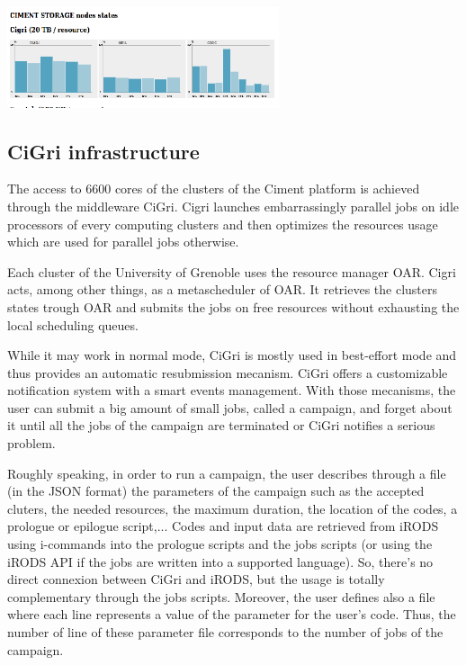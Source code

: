 \documentclass[a4paper, 10pt]{article}
\begin{document}
\begin{multicols}{2}
\begin{center}%
\centering
{}
\includegraphics[width=8cm]{schemaCimentStorageStatus.png}
\end{center}


\subsection{CiGri infrastructure}

The access to 6600 cores of the clusters of the Ciment platform is achieved through the middleware CiGri.
Cigri launches embarrassingly parallel jobs on idle processors of every computing clusters and then optimizes the resources usage which are used for parallel jobs otherwise.

Each cluster of the University of Grenoble uses the resource manager OAR. Cigri acts, among other things, as a metascheduler of OAR.
It retrieves the clusters states trough OAR and submits the jobs on free resources without exhausting the local scheduling queues.


While it may work in normal mode, CiGri is mostly used in best-effort mode and thus provides an automatic resubmission mecanism. CiGri offers a customizable notification system with a smart events management. With those mecanisms, the user can submit a big amount of small jobs, called a campaign, and forget about it until all the jobs of the campaign are terminated or CiGri notifies a serious problem.

Roughly speaking, in order to run a campaign, the user describes through a file (in the JSON format) the parameters of the campaign 
such as the accepted cluters, the needed resources, the maximum duration, the location of the codes, a prologue or epilogue script,...  
Codes and input data are retrieved from iRODS using i-commands into the prologue scripts and the jobs scripts (or using the iRODS API if the jobs are written into a supported language). So, there's no direct connexion between CiGri and iRODS, but the usage is totally complementary through the jobs scripts. 
Moreover, the user defines also a file where each line represents a value of the parameter for the user's code.
Thus, the number of line of these parameter file corresponds to the number of jobs of the campaign.


\end{multicols}
\end{document}
